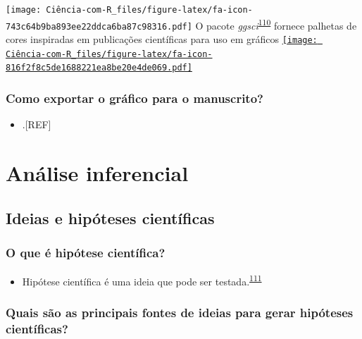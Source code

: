 \documentclass[
]{book}
\providecommand{\tightlist}{%
  \setlength{\itemsep}{0pt}\setlength{\parskip}{0pt}}
\begin{document}
\texttt{[image: Ciência-com-R\_files/figure-latex/fa-icon-743c64b9ba893ee22ddca6ba87c98316.pdf]} O pacote \emph{ggsci}\textsuperscript{\protect\hyperlink{ref-ggsci}{110}} fornece palhetas de cores inspiradas em publicações científicas para uso em gráficos \href{https://cran.r-project.org/web/packages/ggsci/index.html}{\texttt{[image: Ciência-com-R\_files/figure-latex/fa-icon-816f2f8c5de1688221ea8be20e4de069.pdf]}}

\hypertarget{como-exportar-o-gruxe1fico-para-o-manuscrito}{%
\subsection{Como exportar o gráfico para o manuscrito?}\label{como-exportar-o-gruxe1fico-para-o-manuscrito}}

\begin{itemize}
\tightlist
\item
  .{[}REF{]}
\end{itemize}

\hypertarget{analise-inferencial}{%
\chapter{\texorpdfstring{\textbf{Análise inferencial}}{Análise inferencial}}\label{analise-inferencial}}

\hypertarget{ideias-hipoteses}{%
\section{Ideias e hipóteses científicas}\label{ideias-hipoteses}}

\hypertarget{o-que-uxe9-hipuxf3tese-cientuxedfica}{%
\subsection{O que é hipótese científica?}\label{o-que-uxe9-hipuxf3tese-cientuxedfica}}

\begin{itemize}
\tightlist
\item
  Hipótese científica é uma ideia que pode ser testada.\textsuperscript{\protect\hyperlink{ref-Curran-Everett2009}{111}}
\end{itemize}

\hypertarget{quais-suxe3o-as-principais-fontes-de-ideias-para-gerar-hipuxf3teses-cientuxedficas}{%
\subsection{Quais são as principais fontes de ideias para gerar hipóteses científicas?}\label{quais-suxe3o-as-principais-fontes-de-ideias-para-gerar-hipuxf3teses-cientuxedficas}}
\end{document}
